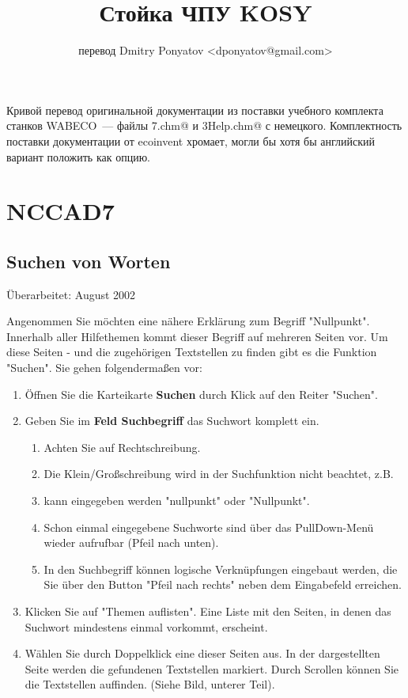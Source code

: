 \documentclass[a4paper]{book}
\title{Стойка ЧПУ KOSY}
\author{перевод Dmitry Ponyatov <dponyatov@gmail.com>}
\begin{document}
\maketitle

Кривой перевод оригинальной документации из поставки учебного комплекта станков
WABECO~--- файлы \verb@nccad7.chm@ и \verb@ZSE3Help.chm@ с немецкого.
Комплектность поставки документации от ecoinvent хромает, могли бы хотя бы
английский вариант положить как опцию.

\tableofcontents

\part{NCCAD7}


\chapter{Suchen von Worten} 

Überarbeitet: August 2002

\bigskip 

Angenommen Sie möchten eine nähere Erklärung zum Begriff "Nullpunkt". Innerhalb aller 
Hilfethemen kommt dieser Begriff auf mehreren Seiten vor. Um diese Seiten - und die 
zugehörigen Textstellen zu finden gibt es die Funktion "Suchen". Sie gehen folgendermaßen 
vor:
\begin{enumerate}
  \item Öffnen Sie die Karteikarte \textbf{Suchen} durch Klick auf den Reiter
  "Suchen".
  \item Geben Sie im \textbf{Feld Suchbegriff} das Suchwort komplett ein. 
\begin{enumerate}
  \item Achten Sie auf Rechtschreibung. 
  \item Die Klein/Großschreibung wird in der Suchfunktion nicht beachtet, z.B.
  \item kann eingegeben werden "nullpunkt" oder "Nullpunkt".
  \item Schon einmal eingegebene Suchworte sind über das PullDown-Menü wieder
  aufrufbar (Pfeil nach unten).
  \item In den Suchbegriff können logische Verknüpfungen eingebaut werden, die
Sie über den Button "Pfeil nach rechts" neben dem Eingabefeld erreichen.
\end{enumerate}
  \item Klicken Sie auf "Themen auflisten". Eine Liste mit den Seiten, in denen
das Suchwort mindestens einmal vorkommt, erscheint.
  \item Wählen Sie durch Doppelklick eine dieser Seiten aus. In der
dargestellten Seite werden die gefundenen Textstellen markiert. Durch Scrollen können Sie die Textstellen auffinden. (Siehe Bild, unterer Teil).
\end{enumerate}
\end{document}
